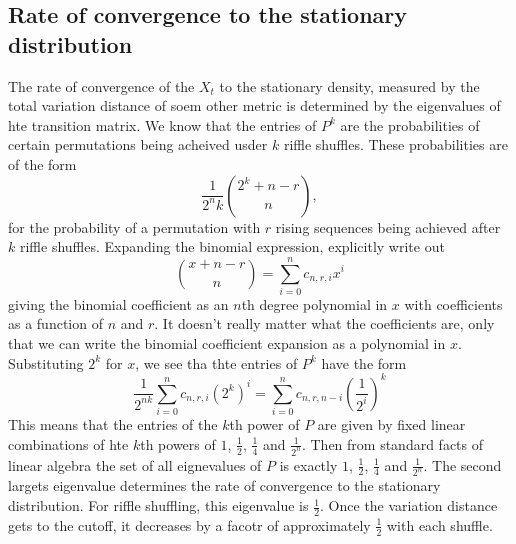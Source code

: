 \documentclass[12pt]{article}
\begin{document}
\subsection*{Rate of convergence to the stationary distribution}

The rate of convergence of the \( X_t \) to the stationary density,
measured by the total variation distance of soem other metric is
determined by the eigenvalues of hte transition matrix.  We know that
the entries of \( P^k \) are the probabilities of certain permutations
being acheived usder \( k \) riffle shuffles.  These probabilities are
of the form
\[
    \frac{1}{2^nk} \binom{2^k +n - r}{n},
\] for the probability of a permutation with \( r \) rising sequences
being achieved after \( k \) riffle shuffles.  Expanding the binomial
expression, explicitly write out
\[
    \binom{x + n - r}{n} = \sum\limits_{i=0}^n c_{n,r,i} x^i
\] giving the binomial coefficient as an \( n \)th degree polynomial in \(
x \) with coefficients as a function of \( n \) and \( r \).  It doesn't
really matter what the coefficients are, only that we can write the
binomial coefficient expansion as a polynomial in \( x \).  Substituting
\( 2^k \) for \( x \), we see tha thte entries of \( P^k \) have the
form
\[
    \frac{1}{2^{nk}} \sum\limits_{i=0}^n c_{n,r,i} \left( 2^k \right)^i
    = \sum\limits_{i=0}^n c_{n,r,n-i} \left( \frac{1}{2^i} \right)^k
\] This means that the entries of the \( k \)th power of \( P \) are
given by fixed linear combinations of hte \( k \)th powers of \( 1 \), \(
\frac{1}{2} \), \( \frac{1}{4} \) and \( \frac{1}{2^n} \).  Then from
standard facts of linear algebra the set of all eignevalues of \( P \)
is exactly \( 1 \), \( \frac{1}{2} \), \( \frac{1}{4} \) and \( \frac{1}
{2^n} \).  The second largets eigenvalue determines the rate of
convergence to the stationary distribution. For riffle shuffling, this
eigenvalue is \( \frac{1}{2} \).  Once the variation distance gets to
the cutoff, it decreases by a facotr of approximately \( \frac{1}{2} \)
with each shuffle.
\end{document}
